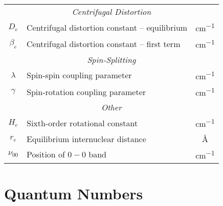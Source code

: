 \documentclass[11pt, twoside, fleqn]{report}
\newcommand{\dash}{\!-\!}
\begin{document}
\begin{table}[H]
\begin{tabular}{clc}
        \multicolumn{3}{c}{\textit{Centrifugal Distortion}}                                                                 \\
        \cmidrule(lr){1-3}
        $D_e$           & Centrifugal distortion constant -- equilibrium                               & \unit{cm^{-1}}   \\
        $\beta_e$       & Centrifugal distortion constant -- first term                                & \unit{cm^{-1}}   \\
        \multicolumn{3}{c}{\textit{Spin-Splitting}}                                                                         \\
        \cmidrule(lr){1-3}
        $\lambda$         & Spin-spin coupling parameter                                                 & \unit{cm^{-1}}   \\
        $\gamma$          & Spin-rotation coupling parameter                                             & \unit{cm^{-1}}   \\
        \multicolumn{3}{c}{\textit{Other}}                                                                                  \\
        \cmidrule(lr){1-3}
        $H_e$           & Sixth-order rotational constant                                              & \unit{cm^{-1}}   \\
        $r_e$           & Equilibrium internuclear distance                                            & \unit{\angstrom} \\
        $\nu_{00}$        & Position of $0\dash0$ band                                                   & \unit{cm^{-1}}   \\
        \bottomrule
    \end{tabular}
\end{table}

\chapter{Quantum Numbers}
\label{a:quantum_numbers}
\end{document}
